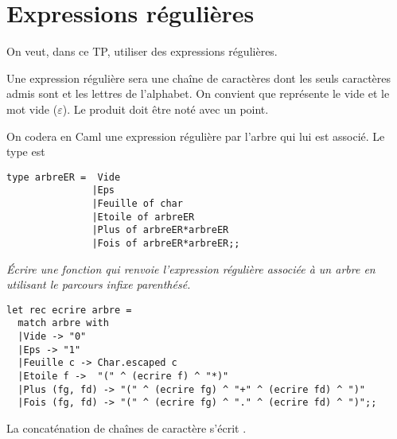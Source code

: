 \chapter{Expressions régulières}
\thispagestyle{empty}
On veut, dans ce TP, utiliser des expressions régulières.


Une expression régulière sera une chaîne de caractères dont les seuls caractères admis sont  et les lettres de l'alphabet. On convient que  représente le vide et  le mot vide ($\varepsilon$). Le produit doit être noté avec un point.

On codera en Caml une expression régulière par l'arbre qui lui est associé. Le type est
\begin{lstlisting}
type arbreER =  Vide
               |Eps
               |Feuille of char
               |Etoile of arbreER
               |Plus of arbreER*arbreER
               |Fois of arbreER*arbreER;;
\end{lstlisting}
\begin{Exercise}\it
Écrire une fonction  qui renvoie l'expression régulière associée à un arbre en utilisant le parcours infixe parenthésé.
\end{Exercise}
\begin{Answer} 
\begin{lstlisting}
let rec ecrire arbre =
  match arbre with
  |Vide -> "0"
  |Eps -> "1"
  |Feuille c -> Char.escaped c
  |Etoile f ->  "(" ^ (ecrire f) ^ "*)"
  |Plus (fg, fd) -> "(" ^ (ecrire fg) ^ "+" ^ (ecrire fd) ^ ")"
  |Fois (fg, fd) -> "(" ^ (ecrire fg) ^ "." ^ (ecrire fd) ^ ")";;
\end{lstlisting}
\end{Answer}
La concaténation de chaînes de caractère s'écrit \type{\^{}}.

